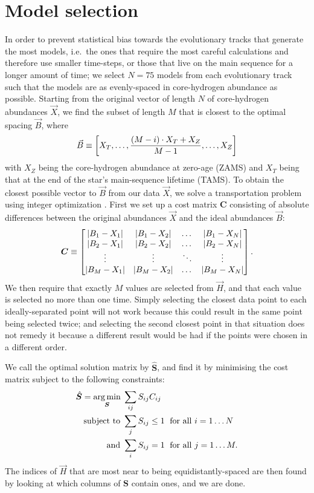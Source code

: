 \documentclass[manuscript]{aastex}
\begin{document}
\section{Model selection}
\label{sec:selection}
In order to prevent statistical bias towards the evolutionary tracks that generate the most models, i.e.~the ones that require the most careful calculations and therefore use smaller time-steps, or those that live on the main sequence for a longer amount of time; we select $N=75$ models from each evolutionary track such that the models are as evenly-spaced in core-hydrogen abundance as possible. Starting from the original vector of length $N$ of core-hydrogen abundances $\vec X$, we find the subset of length $M$ that is closest to the optimal spacing $\vec B$, where
\begin{equation}
  \vec B \equiv \qty[
    X_T, 
    \ldots,
    \frac{(M-i)\cdot X_T + X_Z}{M-1}, 
    \ldots, 
    X_Z
  ]
\end{equation}
with $X_Z$ being the core-hydrogen abundance at zero-age (ZAMS) and $X_T$ being that at the end of the star's main-sequence lifetime (TAMS). To obtain the closest possible vector to $\vec B$ from our data $\vec X$, we solve a transportation problem using integer optimization \citep{23145595}. First we set up a cost matrix $\boldsymbol{C}$ consisting of absolute differences between the original abundances $\vec X$ and the ideal abundances $\vec B$:
\begin{equation}
  \boldsymbol C \equiv 
  \begin{bmatrix}
    \abs{B_1-X_1} & \abs{B_1-X_2} & \dots & \abs{B_1-X_N} \\ 
    \abs{B_2-X_1} & \abs{B_2-X_2} & \dots & \abs{B_2-X_N} \\ 
    \vdots & \vdots & \ddots & \vdots\\ 
    \abs{B_M-X_1} & \abs{B_M-X_2} & \dots & \abs{B_M-X_N}
  \end{bmatrix}.
\end{equation}
We then require that exactly $M$ values are selected from $\vec H$, and that each value is selected no more than one time. Simply selecting the closest data point to each ideally-separated point will not work because this could result in the same point being selected twice; and selecting the second closest point in that situation does not remedy it because a different result would be had if the points were chosen in a different order. 

We call the optimal solution matrix by $\hat{\boldsymbol{S}}$, and find it by minimising the cost matrix subject to the following constraints:
\begin{align}
  \hat{\boldsymbol{S}} = \underset{\boldsymbol S}{\arg\min} \; & \sum_{ij} S_{ij} C_{ij} \notag\\
  \text{subject to } & \sum_j S_{ij} \leq 1 \; \text{ for all } i=1\ldots N \notag\\
  \text{and } & \sum_i S_{ij} = 1 \; \text{ for all } j=1\ldots M.
\end{align}
The indices of $\vec H$ that are most near to being equidistantly-spaced are then found by looking at which columns of $\boldsymbol S$ contain ones, and we are done. 




\end{document}
